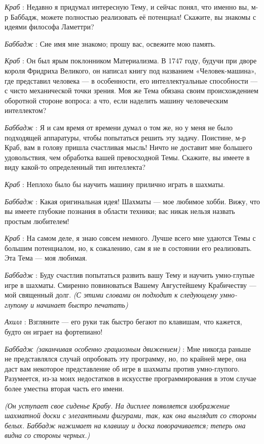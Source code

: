 \documentclass[../main.tex]{subfiles}
\begin{document}
\begin{dialogue}
\emph{Краб} : Недавно я придумал интересную Тему, и сейчас понял, что именно вы, м-р Баббадж, можете полностью реализовать её потенциал! Скажите, вы знакомы с идеями философа Ламеттри?

\emph{Баббадж} : Сие имя мне знакомо; прошу вас, освежите мою память.

\emph{Краб} : Он был ярым поклонником Материализма. В 1747 году, будучи при дворе короля Фридриха Великого, он написал книгу под названием «Человек-машина», где представил человека --- в особенности, его интеллектуальные способности --- с чисто механической точки зрения. Моя же Тема обязана своим происхождением оборотной стороне вопроса: а что, если наделить машину человеческим интеллектом?

\emph{Баббадж} : Я и сам время от времени думал о том же, но у меня не было подходящей аппаратуры, чтобы попытаться решить эту задачу. Поистине, м-р Краб, вам в голову пришла счастливая мысль! Ничто не доставит мне большего удовольствия, чем обработка вашей превосходной Темы. Скажите, вы имеете в виду какой-то определенный тип интеллекта?

\emph{Краб} : Неплохо было бы научить машину прилично играть в шахматы.

\emph{Баббадж} : Какая оригинальная идея! Шахматы --- мое любимое хобби. Вижу, что вы имеете глубокие познания в области техники; вас никак нельзя назвать простым любителем!

\emph{Краб} : На самом деле, я знаю совсем немного. Лучше всего мне удаются Темы с большим потенциалом, но, к сожалению, сам я не в состоянии его реализовать. Эта Тема --- моя любимая.

\emph{Баббадж} : Буду счастлив попытаться развить вашу Тему и научить умно-глупые игре в шахматы. Смиренно повиноваться Вашему Августейшему Крабичеству --- мой священный долг. \emph{(С этими словами он подходит к следующему умно-глупому и начинает быстро печатать)}

\emph{Ахилл} : Взгляните --- его руки так быстро бегают по клавишам, что кажется, будто он играет на фортепиано!

\emph{Баббадж (заканчивая особенно грациозным движением)} : Мне никогда раньше не представлялся случай опробовать эту программу, но, по крайней мере, она даст вам некоторое представление об игре в шахматы против умно-глупого. Разумеется, из-за моих недостатков в искусстве программирования в этом случае более уместна вторая часть его имени.

\emph{(Он уступает свое сиденье Крабу. На дисплее появляется изображение шахматной доски с элегантными фигурами, так, как она выглядит со стороны белых. Баббадж нажимает на клавишу и доска поворачивается; теперь она видна со стороны черных.)}


\end{dialogue}
\end{document}
